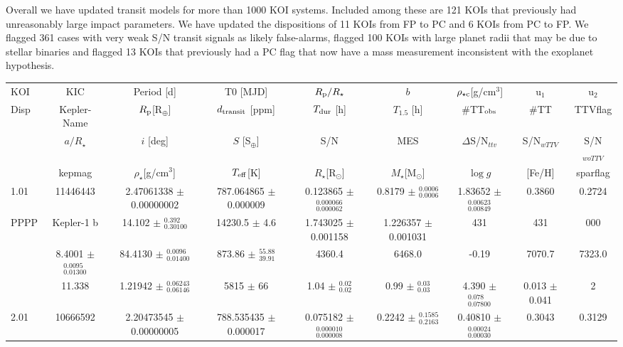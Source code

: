 \documentclass{aastex62}
\newcommand{\teff}{\ensuremath{T_{\rm eff}}}
\newcommand{\logg}{\ensuremath{\log{g}}}
\newcommand{\feh}{[Fe/H]}
\newcommand{\rstar}{\ensuremath{R_\star}}
\newcommand{\mstar}{\ensuremath{M_\star}}
\newcommand{\rsun}{R\ensuremath{_\odot}}
\newcommand{\msun}{M\ensuremath{_\odot}}
\newcommand{\rprs}{\ensuremath{R_{\rm p}/R_\star}}
\newcommand{\rhostar}{\ensuremath{\rho_\star}}
\newcommand{\rhoc}{\ensuremath{\rho_{\star {\rm c}}}}
\newcommand{\rpl}{\ensuremath{R_{\rm p}}}
\newcommand{\adrs}{\ensuremath{a/R_\star}}
\begin{document}
Overall we have updated transit models for more than 1000 KOI systems. Included among these are 121 KOIs that previously had unreasonably large impact parameters.  We have updated the dispositions of 11 KOIs from FP to PC and 6 KOIs from PC to FP.  We flagged 361 cases with very weak S/N transit signals as likely false-alarms, flagged 100 KOIs with large planet radii that may be due to stellar binaries and flagged 13 KOIs that previously had a PC flag that now have a mass measurement inconsistent with the exoplanet hypothesis.

\begin{longrotatetable}
\begin{table}[!hbt]
    \scriptsize
    \centering
    \begin{tabular}{l c c c c c c c c}
\hline
KOI          & KIC         &   Period [d]           & T0 [MJD]          & \rprs       & $b$            & \rhoc [g/cm$^3$]      & u$_1$    & u$_2$ \\
 Disp        & Kepler-Name &   \rpl [R$_\oplus$]       & $d_{\rm transit}$ [ppm]      & $T_{\rm dur}$ [h]     & $T_{1.5}$ [h]      & \#TT$_{\rm obs}$                 & \#TT      & TTVflag \\
             & \adrs      &   $i$ [deg]              & $S$ [S$_\oplus$]        & S/N          & MES          & $\Delta$S/N$_{ttv}$          & S/N$_{wTTV}$  & S/N$_{woTTV}$ \\
             & kepmag      &   \rhostar [g/cm$^3$] & \teff [K]        & \rstar [\rsun] & \mstar [\msun] & \logg                 & \feh   & sparflag \\
\hline
1.01 & 11446443 & 2.47061338 $\pm$ 0.00000002 & 787.064865 $\pm$ 0.000009 & 0.123865 $\pm$ $^{ 0.000066 } _{ 0.000062 }$ & 0.8179 $\pm$ $^{ 0.0006 } _{ 0.0006 }$ & 1.83652 $\pm$ $^{ 0.00623 } _{ 0.00849 }$ & 0.3860 & 0.2724 \\
PPPP & Kepler-1 b & 14.102 $\pm$ $^{ 0.392 } _{ 0.30100 }$ & 14230.5 $\pm$ 4.6 & 1.743025 $\pm$ 0.001158 & 1.226357 $\pm$ 0.001031 & 431 & 431 & 000 \\
& 8.4001 $\pm$ $^{ 0.0095 } _{ 0.01300 }$ & 84.4130 $\pm$ $^{ 0.0096 } _{ 0.01400 }$ & 873.86 $\pm$ $^{ 55.88 } _{ 39.91 }$ & 4360.4 & 6468.0 & -0.19 & 7070.7 & 7323.0 \\
& 11.338 & 1.21942 $\pm$ $^{ 0.06243 } _{ 0.06146 }$ & 5815 $\pm$ 66 & 1.04 $\pm$ $^{ 0.02 } _{ 0.02 }$ & 0.99 $\pm$ $^{ 0.03 } _{ 0.03 }$ & 4.390 $\pm$ $^{ 0.078 } _{ 0.07800 }$ & 0.013 $\pm$ 0.041 & 2 \\
[.2cm]
2.01 & 10666592 & 2.20473545 $\pm$ 0.00000005 & 788.535435 $\pm$ 0.000017 & 0.075182 $\pm$ $^{ 0.000010 } _{ 0.000008 }$ & 0.2242 $\pm$ $^{ 0.1585 } _{ 0.2163 }$ & 0.40810 $\pm$ $^{ 0.00024 } _{ 0.00030 }$ & 0.3043 & 0.3129 \\

\end{tabular}
\end{table}
\end{longrotatetable}
\end{document}
